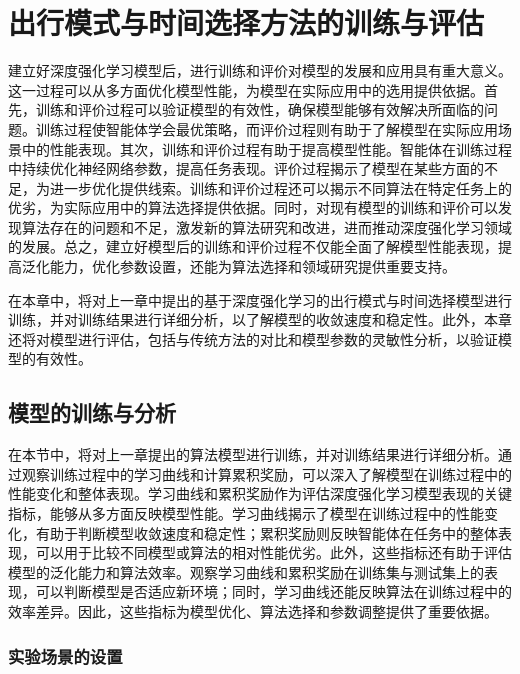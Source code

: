\chapter{出行模式与时间选择方法的训练与评估}

建立好深度强化学习模型后，进行训练和评价对模型的发展和应用具有重大意义。这一过程可以从多方面优化模型性能，为模型在实际应用中的选用提供依据。首先，训练和评价过程可以验证模型的有效性，确保模型能够有效解决所面临的问题。训练过程使智能体学会最优策略，而评价过程则有助于了解模型在实际应用场景中的性能表现。其次，训练和评价过程有助于提高模型性能。智能体在训练过程中持续优化神经网络参数，提高任务表现。评价过程揭示了模型在某些方面的不足，为进一步优化提供线索。训练和评价过程还可以揭示不同算法在特定任务上的优劣，为实际应用中的算法选择提供依据。同时，对现有模型的训练和评价可以发现算法存在的问题和不足，激发新的算法研究和改进，进而推动深度强化学习领域的发展。总之，建立好模型后的训练和评价过程不仅能全面了解模型性能表现，提高泛化能力，优化参数设置，还能为算法选择和领域研究提供重要支持。


在本章中，将对上一章中提出的基于深度强化学习的出行模式与时间选择模型进行训练，并对训练结果进行详细分析，以了解模型的收敛速度和稳定性。此外，本章还将对模型进行评估，包括与传统方法的对比和模型参数的灵敏性分析，以验证模型的有效性。


\section{模型的训练与分析}
\label{section:5.1}

在本节中，将对上一章提出的算法模型进行训练，并对训练结果进行详细分析。通过观察训练过程中的学习曲线和计算累积奖励，可以深入了解模型在训练过程中的性能变化和整体表现。学习曲线和累积奖励作为评估深度强化学习模型表现的关键指标，能够从多方面反映模型性能。学习曲线揭示了模型在训练过程中的性能变化，有助于判断模型收敛速度和稳定性；累积奖励则反映智能体在任务中的整体表现，可以用于比较不同模型或算法的相对性能优劣。此外，这些指标还有助于评估模型的泛化能力和算法效率。观察学习曲线和累积奖励在训练集与测试集上的表现，可以判断模型是否适应新环境；同时，学习曲线还能反映算法在训练过程中的效率差异。因此，这些指标为模型优化、算法选择和参数调整提供了重要依据。

\subsection{实验场景的设置}

